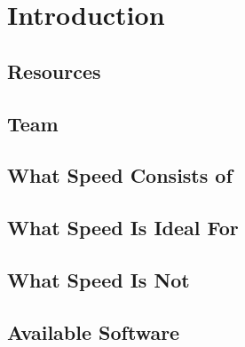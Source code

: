 \documentclass{easychair}
\begin{document}
\tableofcontents
\clearpage

\section{Introduction}
\label{sect:intro}


\subsection{Resources}
\label{sect:resources}


\subsection{Team}
\label{sect:speed-team}


\subsection{What Speed Consists of}
\label{sect:speed-arch}


\subsection{What Speed Is Ideal For}
\label{sect:speed-is-for}


\subsection{What Speed Is Not}
\label{sect:speed-is-not}


\subsection{Available Software}
\label{sect:available-software}

\end{document}
